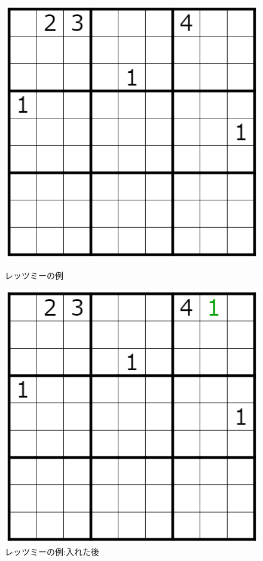 \documentclass[submit,techrep,noauthor]{ipsj}
\begin{document}
	\begin{figure}[tb]
	\begin{minipage}[t]{0.5\columnwidth}
 	\includegraphics[keepaspectratio, scale=0.25]
      		{sample_rettumi.png}
 	\caption{レッツミーの例}
 	\label{sample_rettumi}
	\end{minipage}%
	\begin{minipage}[t]{0.5\columnwidth}
 	\includegraphics[keepaspectratio, scale=0.25]
      		{sample_rettumi_answer.png}
 	\caption{レッツミーの例:入れた後}
 	\label{sample_r_a}
	\end{minipage}
  	\end{figure}
\end{document}
